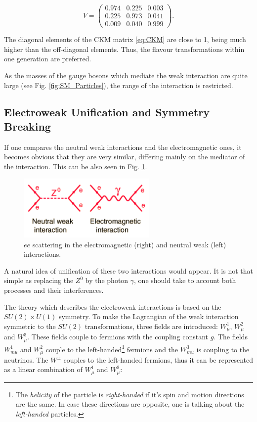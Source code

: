 \begin{equation} \label{eq:CKM}
 V = \left( \begin{array}{ccc} 0.974 & 0.225 & 0.003 \\ 0.225 & 0.973 & 0.041 \\ 0.009 & 0.040 & 0.999 \end{array} \right).
\end{equation}

The diagonal elements of the CKM matrix \ref{eq:CKM} are close to 1, being much higher than the off-diagonal elements. Thus, the flavour transformations
within one generation are preferred.

As the masses of the gauge bosons which mediate the weak interaction are quite large (see Fig. \ref{fig:SM_Particles}), the range of the interaction is restricted.

\subsection{Electroweak Unification and Symmetry Breaking}

If one compares the neutral weak interactions and the electromagnetic ones, it becomes obvious that they are very similar, differing mainly on the mediator
of the interaction. This can be also seen in Fig. \ref{fig:em_weak}.

\begin{figure}[h]
  \centering
  \includegraphics[width=0.6\textwidth]{01_Theory_SM/plots/feynz.png}
  \caption{$ee$ scattering in the electromagnetic (right) and neutral weak (left) interactions.}
  \label{fig:em_weak}
\end{figure}

A natural idea of unification of these two interactions would appear. It is not that simple as replacing the $Z^{0}$ by the photon $\gamma$, one
should take to account both processes and their interferences.

The theory which describes the electroweak interactions is based on the $SU(2) \times U(1)$ symmetry. To make the Lagrangian of the weak interaction
symmetric to the $SU(2)$ transformations, three fields are introduced: $W_{\mu}^{1}$, $W_{\mu}^{2}$ and $W_{\mu}^{3}$. These fields couple to fermions with
the coupling constant $g$. The fields $W_{mu}^{1}$ and $W_{\mu}^{2}$ couple to the left-handed\footnote{The \textit{helicity} of the particle is \textit{right-handed}
if it's spin and motion directions are the same. In case these directions are opposite, one is talking about the \textit{left-handed} particles.} fermions and
the $W_{mu}^{3}$ is coupling to the neutrinos. The $W^{\pm}$ couples to the left-handed fermions, thus it can be represented as a linear combination of
$W_{\mu}^{1}$ and $W_{\mu}^{2}$:

